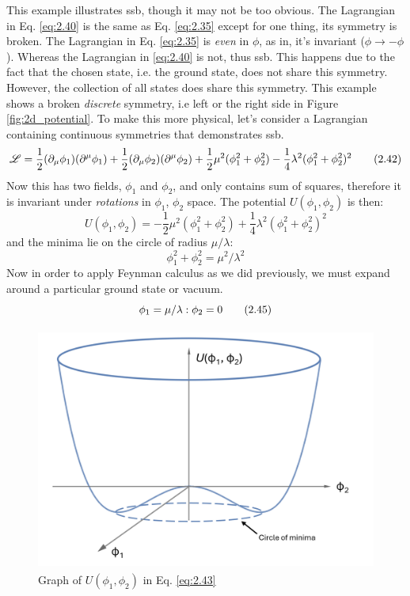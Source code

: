 This example illustrates \gls{ssb}, though it may not be too obvious. The Lagrangian in Eq. \ref{eq:2.40}
is the same as Eq. \ref{eq:2.35} except for one thing, its symmetry is broken. The Lagrangian in 
Eq. \ref{eq:2.35} is \textit{even} in $\phi$, as in, it's invariant ($\phi \rightarrow -\phi$).
Whereas the Lagrangian in \ref{eq:2.40} is not, thus \gls{ssb}. This happens due to the fact that the chosen state,
i.e. the ground state, does not share this symmetry. However, the collection of all states does share this 
symmetry. This example shows a broken \textit{discrete} symmetry, i.e left or the right side in Figure \ref{fig:2d_potential}.
To make this more physical, let's consider a Lagrangian containing continuous symmetries that demonstrates \gls{ssb}. 
%
\begin{equation}\label{eq:2.42}
    \mathscr{L} = \frac{1}2(\partial_{\mu}\phi_{1})(\partial^{\mu}\phi_{1}) + \frac{1}2(\partial_{\mu}\phi_{2})(\partial^{\mu}\phi_{2}) + \frac{1}2\mu^{2}(\phi^{2}_{1}+\phi^{2}_{2})-\frac{1}4\lambda^{2}(\phi^{2}_{1}+\phi^{2}_{2})^{2}
\tag{2.42}
\end{equation}
%
Now this has two fields, $\phi_{1}$ and $\phi_{2}$, and only contains sum of squares, therefore it is invariant under
\textit{rotations} in $\phi_{1}$, $\phi_{2}$ space. The potential $U(\phi_{1},\phi_{2})$ is then:
%
\begin{equation}\label{eq:2.43}
    \textit{U}(\phi_{1},\phi_{2}) = -\frac{1}2\mu^{2}(\phi^2_{1}+\phi^2_{2})+\frac{1}4\lambda^{2}(\phi^{2}_{1}+\phi^{2}_{2})^{2}
\tag{2.43}
\end{equation}
%
and the minima lie on the circle of radius $\mu/\lambda$:
%
\begin{equation}\label{eq:2.44}
    \phi^{2}_{1}+\phi^{2}_{2} = \mu^{2}/\lambda^{2}
\tag{2.44}
\end{equation}
%
Now in order to apply Feynman calculus as we did previously, we must expand around a particular ground state or vacuum.
%
\begin{equation}\label{eq:2.45}
    \phi_{1} = \mu/\lambda: \\ \phi_{2} = 0
\tag{2.45}
\end{equation}
%
\begin{figure}[h]
\includegraphics[width=0.8\linewidth,height=8cm]{figs/ch2/3d_pot_graph2.png}
\centering
\caption{Graph of $\textit{U}(\phi_{1},\phi_{2})$ in Eq. \ref{eq:2.43}}
\label{fig:3d_pot_graph2}
\end{figure}
